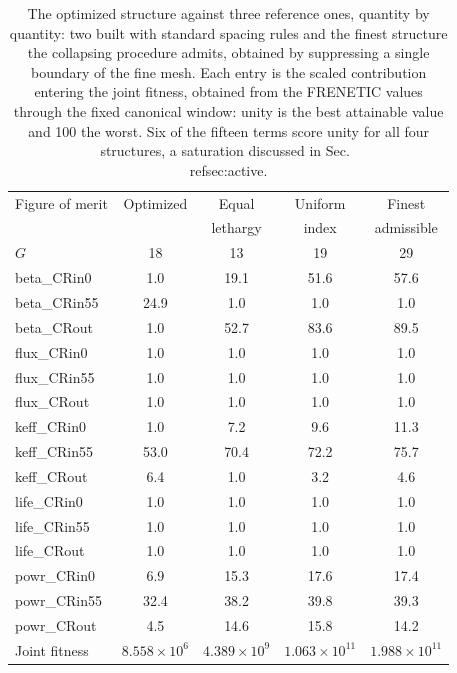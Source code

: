 \begin{table}[htbp]
\centering
\caption{The optimized structure against three reference ones, quantity by
quantity: two built with standard spacing rules and the finest structure the
collapsing procedure admits, obtained by suppressing a single boundary of the
fine mesh. Each entry is the scaled contribution entering the joint fitness,
obtained from the FRENETIC values through the fixed canonical window: unity is
the best attainable value and 100 the worst. Six of the fifteen terms score
unity for all four structures, a saturation discussed in Sec.~\\ref{sec:active}.}
\label{tab:standard}
\begin{tabular}{|l|c|c|c|c|}
\hline
Figure of merit & Optimized & Equal & Uniform & Finest \\
     &  & lethargy & index & admissible \\
    $G$ & 18 & 13 & 19 & 29 \\ \hline
    beta\_CRin0 & 1.0 & 19.1 & 51.6 & 57.6 \\
    beta\_CRin55 & 24.9 & 1.0 & 1.0 & 1.0 \\
    beta\_CRout & 1.0 & 52.7 & 83.6 & 89.5 \\
    flux\_CRin0 & 1.0 & 1.0 & 1.0 & 1.0 \\
    flux\_CRin55 & 1.0 & 1.0 & 1.0 & 1.0 \\
    flux\_CRout & 1.0 & 1.0 & 1.0 & 1.0 \\
    keff\_CRin0 & 1.0 & 7.2 & 9.6 & 11.3 \\
    keff\_CRin55 & 53.0 & 70.4 & 72.2 & 75.7 \\
    keff\_CRout & 6.4 & 1.0 & 3.2 & 4.6 \\
    life\_CRin0 & 1.0 & 1.0 & 1.0 & 1.0 \\
    life\_CRin55 & 1.0 & 1.0 & 1.0 & 1.0 \\
    life\_CRout & 1.0 & 1.0 & 1.0 & 1.0 \\
    powr\_CRin0 & 6.9 & 15.3 & 17.6 & 17.4 \\
    powr\_CRin55 & 32.4 & 38.2 & 39.8 & 39.3 \\
    powr\_CRout & 4.5 & 14.6 & 15.8 & 14.2 \\
\hline
    Joint fitness & $8.558\times10^{6}$ & $4.389\times10^{9}$ & $1.063\times10^{11}$ & $1.988\times10^{11}$ \\ \hline
\end{tabular}
\end{table}

